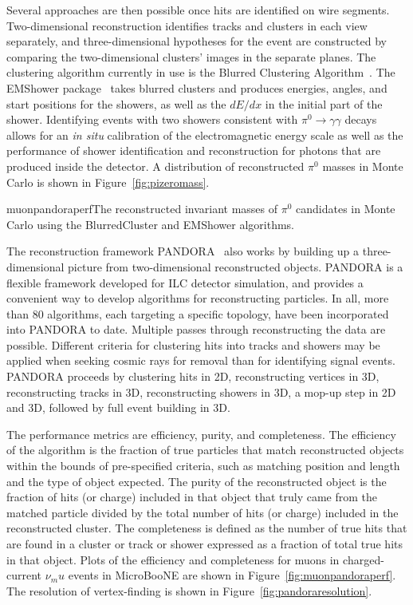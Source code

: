 Several approaches are then possible once hits are identified on wire
segments.  Two-dimensional reconstruction identifies tracks and
clusters in each view separately, and three-dimensional hypotheses for
the event are constructed by comparing the two-dimensional clusters'
images in the separate planes.  The clustering algorithm currently in
use is the Blurred Clustering Algorithm~\cite{blurredclustering}.  The
EMShower package~\cite{emshowerpackage} takes blurred clusters and
produces energies, angles, and start positions for the showers, as
well as the $dE/dx$ in the initial part of the shower.  Identifying
events with two showers consistent with $\pi^0\rightarrow\gamma\gamma$
decays allows for an {\it in situ} calibration of the electromagnetic
energy scale as well as the performance of shower identification and
reconstruction for photons that are produced inside the detector.  A
distribution of reconstructed $\pi^0$ masses in Monte Carlo is shown
in Figure~\ref{fig:pizeromass}.


\begin{cdrfigure}{muonpandoraperf}{The reconstructed invariant masses of $\pi^0$ candidates in
  Monte Carlo using the BlurredCluster and EMShower algorithms.}
\end{cdrfigure}

The reconstruction framework PANDORA~\cite{pandora} also works by
building up a three-dimensional picture from two-dimensional
reconstructed objects.  PANDORA is a flexible framework developed for
ILC detector simulation, and provides a convenient way to develop
algorithms for reconstructing particles.  In all, more than 80
algorithms, each targeting a specific topology, have been incorporated
into PANDORA to date.  Multiple passes through reconstructing the data
are possible.  Different criteria for clustering hits into tracks and
showers may be applied when seeking cosmic rays for removal than for
identifying signal events.  PANDORA proceeds by clustering hits in 2D,
reconstructing vertices in 3D, reconstructing tracks in 3D,
reconstructing showers in 3D, a mop-up step in 2D and 3D, followed by
full event building in 3D.

The performance metrics are efficiency, purity, and completeness.  The
efficiency of the algorithm is the fraction of true particles that
match reconstructed objects within the bounds of pre-specified
criteria, such as matching position and length and the type of object
expected.  The purity of the reconstructed object is the fraction of
hits (or charge) included in that object that truly came from the
matched particle divided by the total number of hits (or charge)
included in the reconstructed cluster.  The completeness is defined as
the number of true hits that are found in a cluster or track or shower
expressed as a fraction of total true hits in that object.  Plots of
the efficiency and completeness for muons in charged-current $\nu_mu$
events in MicroBooNE are shown in Figure~\ref{fig:muonpandoraperf}.
The resolution of vertex-finding is shown in
Figure~\ref{fig:pandoraresolution}.

